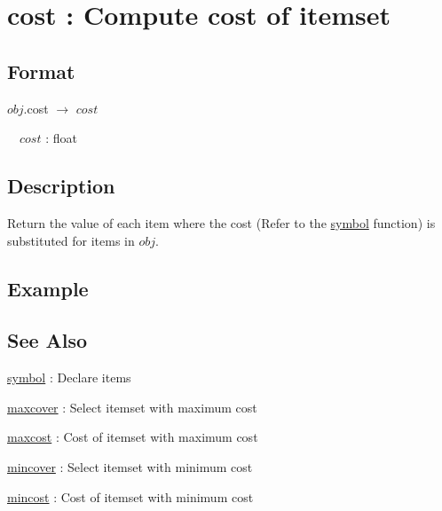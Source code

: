 
\section{cost : Compute cost of itemset\label{sect:cost}}
\subsection*{Format}
$obj$.cost $\rightarrow$ $cost$

~~$cost$ : float

\subsection*{Description}

Return the value of each item where the cost (Refer to the \hyperref[sect:symbol]{symbol} function) is substituted for items in $obj$. 


\subsection*{Example}


\subsection*{See Also}
\hyperref[sect:symbol]{symbol} : Declare items

\hyperref[sect:maxcover]{maxcover} : Select itemset with maximum cost 

\hyperref[sect:maxcost]{maxcost} : Cost of itemset with maximum cost

\hyperref[sect:mincover]{mincover} : Select itemset with minimum cost 

\hyperref[sect:mincost]{mincost} : Cost of itemset with minimum cost

